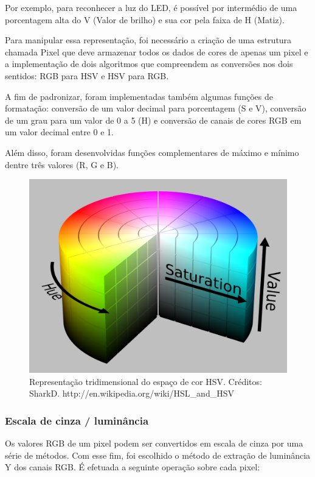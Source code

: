 \documentclass[12pt]{article}
\begin{document}
Por exemplo, para reconhecer a luz do LED, \'e poss\'ivel por interm\'edio de uma porcentagem alta
do V (Valor de brilho) e sua cor pela faixa de H (Matiz).

Para manipular essa representa\c c\~ao, foi necess\'ario a cria\c c\~ao de uma estrutura chamada Pixel
que deve armazenar todos os dados de cores de apenas um pixel e a implementa\c c\~ao de dois algoritmos
que compreendem as convers\~oes nos dois sentidos: RGB para HSV e HSV para RGB.

A fim de padronizar, foram implementadas tamb\'em algumas fun\c c\~oes de formata\c c\~ao: convers\~ao de
um valor decimal para porcentagem (S e V), convers\~ao de um grau para um valor de 0 a 5 (H) e convers\~ao
de canais de cores RGB em um valor decimal entre 0 e 1.

Al\'em disso, foram desenvolvidas fun\c c\~oes complementares de m\'aximo e m\'inimo dentre tr\^es valores (R, G e B).

	\begin{figure}[ht!]
	\begin{center}
		\includegraphics[scale=0.15]{img/HSV_color_solid_cylinder_alpha_lowgamma.png}
		\footnotesize \caption{Representa\c c\~ao tridimensional do espa\c co de cor HSV. Cr\'editos: SharkD. http://en.wikipedia.org/wiki/HSL\_and\_HSV }
	\end{center}
	\end{figure}	

\subsubsection{Escala de cinza / lumin\^ancia}
Os valores RGB de um pixel podem ser convertidos em escala de cinza por uma s\'erie de m\'etodos.
Com esse fim, foi escolhido o m\'etodo de extra\c c\~ao de lumin\^ancia Y dos canais RGB.
\'E efetuada a seguinte opera\c c\~ao sobre cada pixel:
\end{document}
